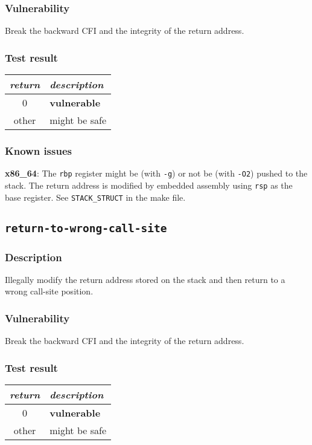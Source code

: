 \documentclass[a4paper]{book}
\begin{document}
\subsubsection{Vulnerability}
Break the backward CFI and the integrity of the return address.

\subsubsection{Test result}
\begin{tabular}{cl}
  \toprule
  \emph{return}  & \emph{description} \\
  \midrule
  0              & \textbf{vulnerable} \\
  other          & might be safe \\
  \bottomrule
\end{tabular}
  
\subsubsection{Known issues}

\textbf{x86\_64}: The \texttt{rbp} register might be (with \texttt{-g}) or not be (with \texttt{-O2}) pushed to the stack.
The return address is modified by embedded assembly using \texttt{rsp} as the base register. See \texttt{STACK\_STRUCT} in the make file.

\newpage
\subsection{\texttt{return-to-wrong-call-site}}\label{test-return-to-wrong-call-site}

\subsubsection{Description}
Illegally modify the return address stored on the stack and then return to a wrong call-site position.

\subsubsection{Vulnerability}
Break the backward CFI and the integrity of the return address.

\subsubsection{Test result}
\begin{tabular}{cl}
  \toprule
  \emph{return}  & \emph{description} \\
  \midrule
  0              & \textbf{vulnerable} \\
  other          & might be safe \\
  \bottomrule
\end{tabular}
  
\end{document}
